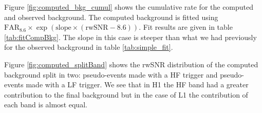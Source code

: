 Figure \ref{fig:computed_bkg_cumul} shows the cumulative rate for the computed and observed background.
The computed background is fitted using $\text{FAR$_{8.6}$} \times \exp(\text{slope} \times (\text{rwSNR}-8.6))$.
Fit results are given in table \ref{tab:fitCompBkg}.
The slope in this case is steeper than what we had previously for the observed background in table \ref{tab:simple_fit}.

Figure \ref{fig:computed_splitBand} shows the rwSNR distribution of the computed background split in two: pseudo-events made with a HF trigger and pseudo-events made with a LF trigger.
We see that in H1 the HF band had a greater contribution to the final background but in the case of L1 the contribution of each band is almost equal.

\begin{table}
  \centering
  \caption{Parameters of the fits using trigger-random noise coincidences}
  \label{tab:fitCompBkg}
\end{table}







